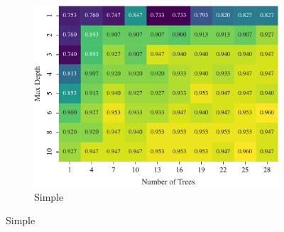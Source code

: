 \documentclass[conference]{IEEEtran}
\begin{document}
\begin{figure}[H]
  \centering
  \begin{subfigure}[b]{\columnwidth}
    \includegraphics[width=\linewidth]{images/simple_depth_vs_trees_heatmap.pdf}
    \caption{Simple}
    \label{fig:exp3-simple-heatmap-a}
  \end{subfigure}\hfill


\end{figure}
\end{document}
